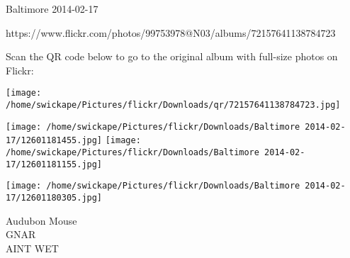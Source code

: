 \documentclass[10pt,letterpaper]{article}
\begin{document}
Baltimore 2014-02-17

https://www.flickr.com/photos/99753978@N03/albums/72157641138784723

Scan the QR code below to go to the original album with full-size photos on Flickr:

\texttt{[image: /home/swickape/Pictures/flickr/Downloads/qr/72157641138784723.jpg]}
\pagebreak

\texttt{[image: /home/swickape/Pictures/flickr/Downloads/Baltimore 2014-02-17/12601181455.jpg]}
\texttt{[image: /home/swickape/Pictures/flickr/Downloads/Baltimore 2014-02-17/12601181155.jpg]}

\texttt{[image: /home/swickape/Pictures/flickr/Downloads/Baltimore 2014-02-17/12601180305.jpg]}

Audubon Mouse\\
GNAR\\
AINT WET\\
\pagebreak
\end{document}
